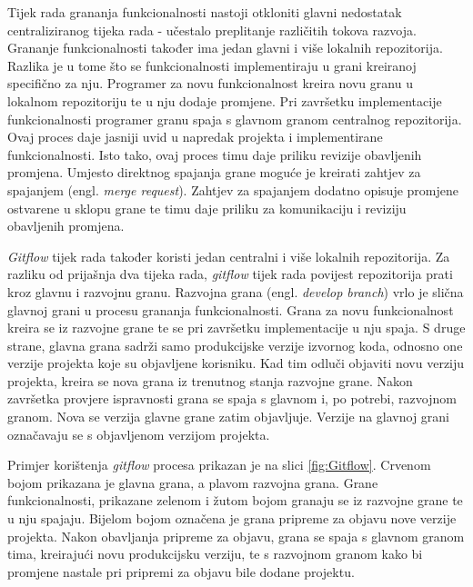 \documentclass[times, utf8, diplomski, numeric]{fer}
\newcommand{\eng}[1]{(engl. \textit{#1})}
\begin{document}
Tijek rada grananja funkcionalnosti nastoji otkloniti glavni nedostatak centraliziranog tijeka rada - učestalo preplitanje različitih tokova razvoja. Grananje funkcionalnosti također ima jedan glavni i više lokalnih repozitorija. Razlika je u tome što se funkcionalnosti implementiraju u grani kreiranoj specifično za nju. Programer za novu funkcionalnost kreira novu granu u lokalnom repozitoriju te u nju dodaje promjene. Pri završetku implementacije funkcionalnosti programer granu spaja s glavnom granom centralnog repozitorija. Ovaj proces daje jasniji uvid u napredak projekta i implementirane funkcionalnosti. Isto tako, ovaj proces timu daje priliku revizije obavljenih promjena. Umjesto direktnog spajanja grane moguće je kreirati zahtjev za spajanjem \eng{merge request}. Zahtjev za spajanjem dodatno opisuje promjene ostvarene u sklopu grane te timu daje priliku za komunikaciju i reviziju obavljenih promjena.

\textit{Gitflow} tijek rada također koristi jedan centralni i više lokalnih repozitorija. Za razliku od prijašnja dva tijeka rada, \textit{gitflow} tijek rada povijest repozitorija prati kroz glavnu i razvojnu granu. Razvojna grana \eng{develop branch} vrlo je slična glavnoj grani u procesu grananja funkcionalnosti. Grana za novu funkcionalnost kreira se iz razvojne grane te se pri završetku implementacije u nju spaja. S druge strane, glavna grana sadrži samo produkcijske verzije izvornog koda, odnosno one verzije projekta koje su objavljene korisniku. Kad tim odluči objaviti novu verziju projekta, kreira se nova grana iz trenutnog stanja razvojne grane. Nakon završetka provjere ispravnosti grana se spaja s glavnom i, po potrebi, razvojnom granom. Nova se verzija glavne grane zatim objavljuje. Verzije na glavnoj grani označavaju se s objavljenom verzijom projekta.

Primjer korištenja \textit{gitflow} procesa prikazan je na slici \ref{fig:Gitflow}. Crvenom bojom prikazana je glavna grana, a plavom razvojna grana. Grane funkcionalnosti, prikazane zelenom i žutom bojom granaju se iz razvojne grane te u nju spajaju. Bijelom bojom označena je grana pripreme za objavu nove verzije projekta. Nakon obavljanja pripreme za objavu, grana se spaja s glavnom granom tima, kreirajući novu produkcijsku verziju, te s razvojnom granom kako bi promjene nastale pri pripremi za objavu bile dodane projektu.
\end{document}
